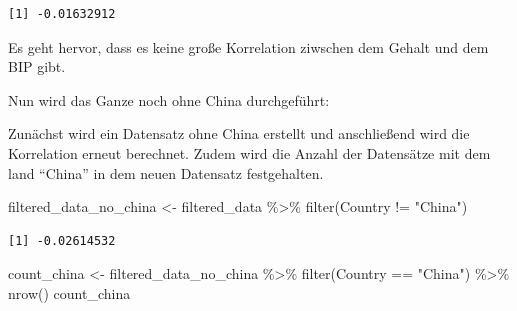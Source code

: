 \documentclass[
  letterpaper,
  DIV=11,
  numbers=noendperiod]{scrartcl}
\newenvironment{Shaded}{\begin{snugshade}}{\end{snugshade}}
\newcommand{\AttributeTok}[1]{\textcolor[rgb]{0.40,0.45,0.13}{#1}}
\newcommand{\FunctionTok}[1]{\textcolor[rgb]{0.28,0.35,0.67}{#1}}
\newcommand{\NormalTok}[1]{\textcolor[rgb]{0.00,0.23,0.31}{#1}}
\newcommand{\OtherTok}[1]{\textcolor[rgb]{0.00,0.23,0.31}{#1}}
\newcommand{\SpecialCharTok}[1]{\textcolor[rgb]{0.37,0.37,0.37}{#1}}
\newcommand{\StringTok}[1]{\textcolor[rgb]{0.13,0.47,0.30}{#1}}
\begin{document}
\begin{Shaded}
\end{Shaded}

\begin{verbatim}
[1] -0.01632912
\end{verbatim}

Es geht hervor, dass es keine große Korrelation ziwschen dem Gehalt und
dem BIP gibt.

Nun wird das Ganze noch ohne China durchgeführt:

Zunächst wird ein Datensatz ohne China erstellt und anschließend wird
die Korrelation erneut berechnet. Zudem wird die Anzahl der Datensätze
mit dem land ``China'' in dem neuen Datensatz festgehalten.

\begin{Shaded}
\begin{Highlighting}[]
\NormalTok{filtered\_data\_no\_china }\OtherTok{\textless{}{-}}\NormalTok{ filtered\_data }\SpecialCharTok{\%\textgreater{}\%} \FunctionTok{filter}\NormalTok{(Country }\SpecialCharTok{!=} \StringTok{"China"}\NormalTok{)}
\end{Highlighting}
\end{Shaded}

\begin{Shaded}
\end{Shaded}

\begin{verbatim}
[1] -0.02614532
\end{verbatim}

\begin{Shaded}
\begin{Highlighting}[]
\NormalTok{count\_china }\OtherTok{\textless{}{-}}\NormalTok{ filtered\_data\_no\_china }\SpecialCharTok{\%\textgreater{}\%} \FunctionTok{filter}\NormalTok{(Country }\SpecialCharTok{==} \StringTok{"China"}\NormalTok{) }\SpecialCharTok{\%\textgreater{}\%} \FunctionTok{nrow}\NormalTok{()}
\NormalTok{count\_china}
\end{Highlighting}
\end{Shaded}
\end{document}
